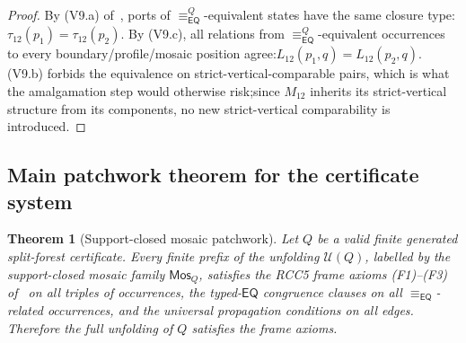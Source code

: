 \documentclass[11pt]{article}
\newtheorem{theorem}{Theorem}[section]
\newcommand{\EQ}{\mathsf{EQ}}
\newcommand{\eqrel}{\equiv_{\EQ}}
\newcommand{\eqQ}{\equiv_{\EQ}^{Q}}
\newcommand{\Mos}{\mathsf{Mos}}
\begin{document}
\begin{proof}
By (V9.a) of~\cite[Def.~4.5]{repaired}, ports of \(\eqQ\)-equivalent
states have the same closure type:\@ \(\tau_{12}(p_1) = \tau_{12}(p_2)\).
By (V9.c), all relations from \(\eqQ\)-equivalent occurrences to every
boundary/profile/mosaic position agree:\@ \(L_{12}(p_1, q) = L_{12}(p_2, q)\).
(V9.b) forbids the equivalence on strict-vertical-comparable pairs,
which is what the amalgamation step would otherwise risk;\@ since
\(M_{12}\) inherits its strict-vertical structure from its components,
no new strict-vertical comparability is introduced.
\end{proof}

\subsection{Main patchwork theorem for the certificate system}

\begin{theorem}[Support-closed mosaic patchwork]\label{thm:patchwork}
Let \(Q\) be a valid finite generated split-forest certificate.
Every finite prefix of the unfolding \(\mathcal U(Q)\), labelled by
the support-closed mosaic family \(\Mos_Q\), satisfies the RCC5
frame axioms \textnormal{(F1)--(F3)} of~\cite[\S3.2]{repaired}
on all triples of occurrences, the typed-\(\EQ\) congruence
clauses on all \(\eqrel\)-related occurrences, and the universal
propagation conditions on all edges.  Therefore the full unfolding
of \(Q\) satisfies the frame axioms.
\end{theorem}
\end{document}
